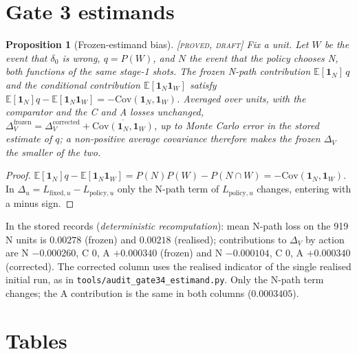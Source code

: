 \documentclass[10pt,twocolumn]{article}
\newtheorem{proposition}[theorem]{Proposition}
\theoremstyle{definition}
\theoremstyle{remark}
\newcommand{\status}[1]{\hfill{\footnotesize\upshape\textsc{[#1]}}}
\newcommand{\E}{\mathbb{E}}
\newcommand{\one}{\mathbf 1}
\newcommand{\DV}{\Delta_V}
\begin{document}
\section{Gate 3 estimands}\label{app:estimand}

\begin{proposition}[Frozen-estimand bias]\label{prop:cov}\status{proved, draft}
Fix a unit. Let $W$ be the event that $\delta_0$ is wrong, $q=P(W)$, and $N$ the event that the policy chooses N, both functions of the same stage-1 shots. The frozen N-path contribution $\E[\one_N]\,q$ and the conditional contribution $\E[\one_N\one_W]$ satisfy
$\E[\one_N]q-\E[\one_N\one_W]=-\mathrm{Cov}(\one_N,\one_W)$.
Averaged over units, with the comparator and the C and A losses unchanged, $\DV^{\mathrm{frozen}}=\DV^{\mathrm{corrected}}+\overline{\mathrm{Cov}(\one_N,\one_W)}$, up to Monte Carlo error in the stored estimate of $q$; a non-positive average covariance therefore makes the frozen $\DV$ the smaller of the two.
\end{proposition}
\begin{proof}
$\E[\one_N]q-\E[\one_N\one_W]=P(N)P(W)-P(N\cap W)=-\mathrm{Cov}(\one_N,\one_W)$. In $\Delta_u=L_{\mathrm{fixed},u}-L_{\mathrm{policy},u}$ only the N-path term of $L_{\mathrm{policy},u}$ changes, entering with a minus sign.
\end{proof}
\noindent In the stored records (\emph{deterministic recomputation}): mean N-path loss on the 919 N units is $0.00278$ (frozen) and $0.00218$ (realised); contributions to $\DV$ by action are N $-0.000260$, C $0$, A $+0.000340$ (frozen) and N $-0.000104$, C $0$, A $+0.000340$ (corrected). The corrected column uses the realised indicator of the single realised initial run, as in \texttt{tools/audit\_gate34\_estimand.py}. Only the N-path term changes; the A contribution is the same in both columns ($0.0003405$).

\section{Tables}\label{app:tables}
\end{document}
